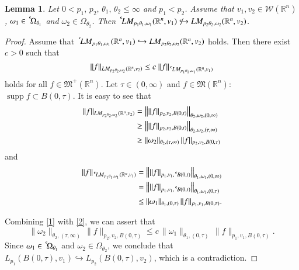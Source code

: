 \documentclass[11pt]{amsart}
\theoremstyle{plain}
\newtheorem{lem}[thm]{Lemma}
\theoremstyle{definition}
\numberwithin{thm}{section}
\numberwithin{equation}{section}
\begin{document}
\begin{lem}\label{triviality}
	Let $0 < p_1, \,p_2, \,{\theta}_1, \,{\theta}_2 \leq \infty$ and $p_1 < p_2$. Assume that $v_1, v_2\in {{\mathcal W}}({{\mathbb R}^n})$, ${\omega}_1\in {\,^{^{\bf c}}\!}{{\Omega}_{{\theta}_1}}$ and ${\omega}_2\in {\Omega}_{{\theta}_2}$. Then ${\,^{^{\bf c}}\!}{LM_{p_1{\theta}_1,{\omega}_1}({{\mathbb R}^n},v_1)}\not \hookrightarrow LM_{p_2{\theta}_2,{\omega}_2}({{\mathbb R}^n},v_2)$.
\end{lem}
\begin{proof}
	Assume that ${\,^{^{\bf c}}\!}{LM_{p_1{\theta}_1,{\omega}_1}({{\mathbb R}^n},v_1)} \hookrightarrow LM_{p_2{\theta}_2,{\omega}_2}({{\mathbb R}^n},v_2)$ holds. Then there exist $c>0$ such that
	\begin{equation*}
	\|f\|_{LM_{p_2{\theta}_2,{\omega}_2}({{\mathbb R}^n},v_2)} \leq c \ \|f\|_{{\,^{^{\bf c}}\!}{LM_{p_1{\theta}_1,{\omega}_1}({{\mathbb R}^n},v_1)}}
	\end{equation*}
	holds for all $f\in {\mathfrak M}^+({{\mathbb R}^n})$. Let $\tau\in (0,\infty)$ and $f\in {\mathfrak M}({{\mathbb R}^n})$:  ${\operatorname{supp}} f\subset  B(0,\tau)$. It is easy to see that
	\begin{align}
	\|f\|_{LM_{p_2{\theta}_2,{\omega}_2}({{\mathbb R}^n},v_2)}&= \big\| \|f\|_{p_2,v_2,B(0,t)} \big\|_{{\theta}_2,{\omega}_2,(0,\infty)}\notag\\
	&\geq \big\| \|f\|_{p_2,v_2,B(0,t)} \big\|_{{\theta}_2,{\omega}_2,(\tau,\infty)}\notag\\
	&\geq \|{\omega}_2 \|_{{\theta}_2,(\tau,\infty)} \, \|f\|_{p_2,v_2,B(0,\tau)} \label{1}
	\end{align}
	and
	\begin{align}
	\|f\|_{{\,^{^{\bf c}}\!} LM_{p_1{\theta}_1,{\omega}_1}({{\mathbb R}^n},v_1)}&= \big\| \|f\|_{p_1,v_1,{\,^{^{\bf c}}\!} B(0,t)} \big\|_{{\theta}_1,{\omega}_1,(0,\infty)}\notag\\
	&= \big\| \|f\|_{p_1,v_1,{\,^{^{\bf c}}\!} B(0,t)} \big\|_{{\theta}_1,{\omega}_1,(0,\tau)}\notag\\
	&\leq \| {\omega}_1 \|_{{\theta}_1,(0,\tau)} \, \|f\|_{p_1,v_1, B(0,\tau)} \label{2}.
	\end{align}
	
	Combining \eqref{1} with \eqref{2}, we can assert that
	\begin{equation*}
	\| {\omega}_2 \|_{{\theta}_2,(\tau,\infty)} \, \|f\|_{p_2,v_2,B(0,\tau)}\leq c \, \| {\omega}_1 \|_{{\theta}_1,(0,\tau)} \,  \|f\|_{p_1,v_1,B(0,\tau)}.
	\end{equation*}
	Since ${\omega}_1\in {\,^{^{\bf c}}\!}{{\Omega}_{{\theta}_1}}$ and ${\omega}_2\in {\Omega}_{{\theta}_2}$, we conclude that $L_{p_1}(B(0,\tau),v_1)\hookrightarrow L_{p_2}(B(0,\tau),v_2)$, which is a contradiction.
\end{proof}
\end{document}
